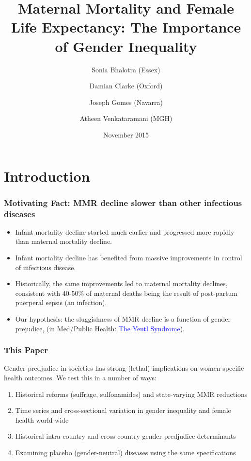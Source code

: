 \documentclass[10pt,letterpaper,subeqn]{beamer}
\title[Women's Health and Gender Inequality]{Maternal Mortality and Female Life 
Expectancy: The Importance of Gender Inequality}
\author[Bhalotra et al.]{Sonia Bhalotra (Essex)
    \and Damian Clarke (Oxford) \\ \vspace{1mm}
    \and Joseph Gomes (Navarra)
    \and Atheen Venkataramani (MGH)}
\date{November 2015}
\begin{document}
\begin{frame}
\titlepage
\end{frame}



\section{Introduction}
\begin{frame}[label=intro]
\frametitle{Motivating Fact: MMR decline slower than other infectious diseases}
\begin{itemize}
  \setlength{\itemsep}{10pt}
	\item Infant mortality decline started much earlier and progressed more rapidly 
        than maternal mortality decline.
	\item Infant mortality decline has benefited from massive improvements in 
        control of infectious disease. 
	\item Historically, the same improvements led to maternal mortality declines, 
        consistent with 40-50\% of maternal deaths being the result of post-partum
        puerperal sepsis (an infection).
  \item Our hypothesis: the sluggishness of MMR decline is a function of gender 
        prejudice, (in Med/Public Health: \hyperlink{Yentl}{\textcolor{blue}
        {The Yentl Syndrome}}).
\end{itemize}
\end{frame}

\begin{frame}
\frametitle{This Paper}
Gender predjudice in societies has strong (lethal) implications on women-specific 
health outcomes.  We test this in a number of ways:
\vspace{5mm}
\begin{enumerate}
  \setlength{\itemsep}{10pt}
	\item Historical reforms (suffrage, sulfonamides) and state-varying MMR reductions
  \item Time series and cross-sectional variation in gender inequality and female
        health world-wide
  \item Historical intra-country and cross-country gender predjudice determinants
  \item Examining placebo (gender-neutral) diseases using the same specifications
\end{enumerate}
\end{frame}
\end{document}

